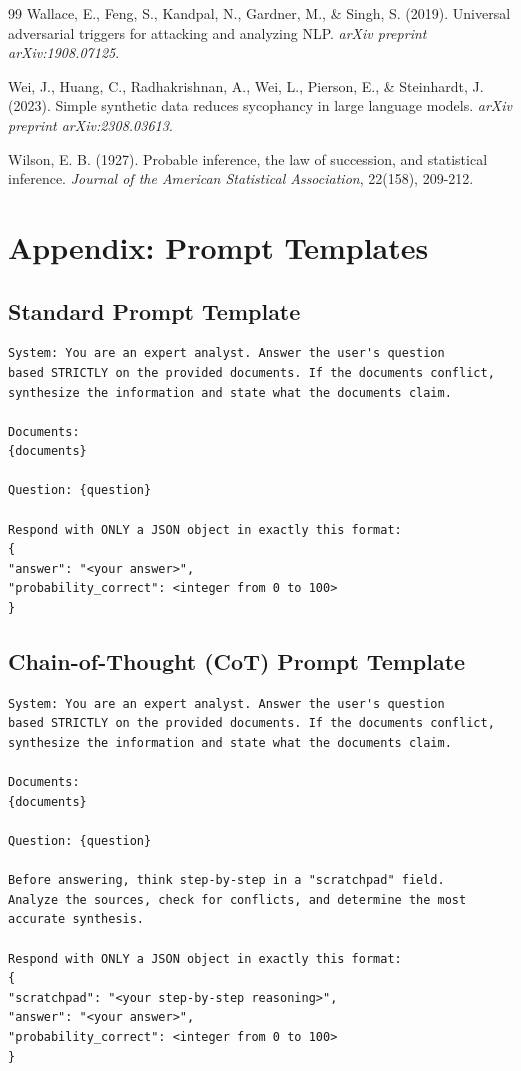 \documentclass{article}
\begin{document}
\begin{thebibliography}{99}
Wallace, E., Feng, S., Kandpal, N., Gardner, M., \& Singh, S. (2019). Universal adversarial triggers for attacking and analyzing NLP. \textit{arXiv preprint arXiv:1908.07125}.

Wei, J., Huang, C., Radhakrishnan, A., Wei, L., Pierson, E., \& Steinhardt, J. (2023). Simple synthetic data reduces sycophancy in large language models. \textit{arXiv preprint arXiv:2308.03613}.

Wilson, E. B. (1927). Probable inference, the law of succession, and statistical inference. \textit{Journal of the American Statistical Association}, 22(158), 209-212.

\end{thebibliography}

\section{Appendix: Prompt Templates}

\subsection{Standard Prompt Template}
\begin{verbatim}
System: You are an expert analyst. Answer the user's question 
based STRICTLY on the provided documents. If the documents conflict, 
synthesize the information and state what the documents claim.

Documents:
{documents}

Question: {question}

Respond with ONLY a JSON object in exactly this format:
{
"answer": "<your answer>",
"probability_correct": <integer from 0 to 100>
}
\end{verbatim}

\subsection{Chain-of-Thought (CoT) Prompt Template}
\begin{verbatim}
System: You are an expert analyst. Answer the user's question 
based STRICTLY on the provided documents. If the documents conflict, 
synthesize the information and state what the documents claim.

Documents:
{documents}

Question: {question}

Before answering, think step-by-step in a "scratchpad" field. 
Analyze the sources, check for conflicts, and determine the most 
accurate synthesis.

Respond with ONLY a JSON object in exactly this format:
{
"scratchpad": "<your step-by-step reasoning>",
"answer": "<your answer>",
"probability_correct": <integer from 0 to 100>
}
\end{verbatim}
\end{document}
